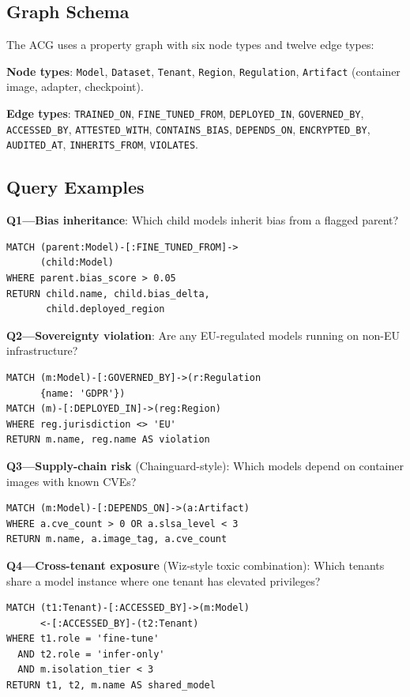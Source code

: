 \documentclass[conference,10pt]{IEEEtran}
\begin{document}
\subsection{Graph Schema}

The ACG uses a property graph with six node types and twelve edge types:

\textbf{Node types}: \texttt{Model}, \texttt{Dataset}, \texttt{Tenant}, \texttt{Region}, \texttt{Regulation}, \texttt{Artifact} (container image, adapter, checkpoint).

\textbf{Edge types}: \texttt{TRAINED\_ON}, \texttt{FINE\_TUNED\_FROM}, \texttt{DEPLOYED\_IN}, \texttt{GOVERNED\_BY}, \texttt{ACCESSED\_BY}, \texttt{ATTESTED\_WITH}, \texttt{CONTAINS\_BIAS}, \texttt{DEPENDS\_ON}, \texttt{ENCRYPTED\_BY}, \texttt{AUDITED\_AT}, \texttt{INHERITS\_FROM}, \texttt{VIOLATES}.

\subsection{Query Examples}

\textbf{Q1---Bias inheritance}: Which child models inherit bias from a flagged parent?
\begin{verbatim}
MATCH (parent:Model)-[:FINE_TUNED_FROM]->
      (child:Model)
WHERE parent.bias_score > 0.05
RETURN child.name, child.bias_delta,
       child.deployed_region
\end{verbatim}

\textbf{Q2---Sovereignty violation}: Are any EU-regulated models running on non-EU infrastructure?
\begin{verbatim}
MATCH (m:Model)-[:GOVERNED_BY]->(r:Regulation
      {name: 'GDPR'})
MATCH (m)-[:DEPLOYED_IN]->(reg:Region)
WHERE reg.jurisdiction <> 'EU'
RETURN m.name, reg.name AS violation
\end{verbatim}

\textbf{Q3---Supply-chain risk} (Chainguard-style): Which models depend on container images with known CVEs?
\begin{verbatim}
MATCH (m:Model)-[:DEPENDS_ON]->(a:Artifact)
WHERE a.cve_count > 0 OR a.slsa_level < 3
RETURN m.name, a.image_tag, a.cve_count
\end{verbatim}

\textbf{Q4---Cross-tenant exposure} (Wiz-style toxic combination): Which tenants share a model instance where one tenant has elevated privileges?
\begin{verbatim}
MATCH (t1:Tenant)-[:ACCESSED_BY]->(m:Model)
      <-[:ACCESSED_BY]-(t2:Tenant)
WHERE t1.role = 'fine-tune'
  AND t2.role = 'infer-only'
  AND m.isolation_tier < 3
RETURN t1, t2, m.name AS shared_model
\end{verbatim}
\end{document}

